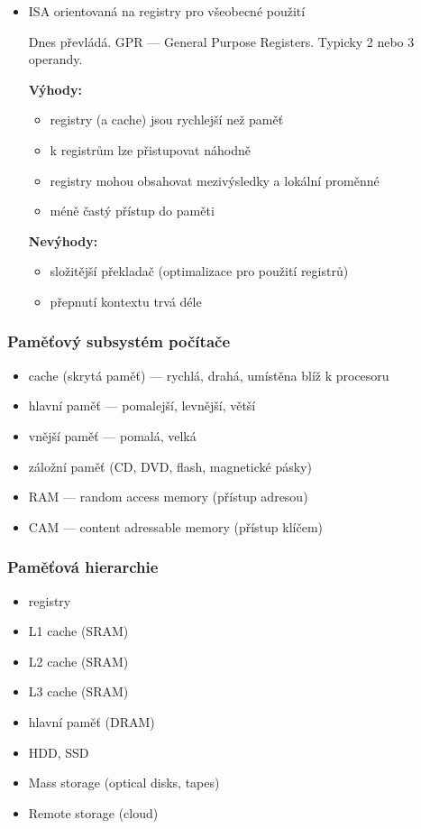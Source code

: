 \begin{itemize}
	\item ISA orientovaná na registry pro všeobecné použití
	
	Dnes převládá. GPR --- General Purpose Registers. Typicky 2 nebo 3 operandy.
	
	\textbf{Výhody:}
	\begin{itemize}
		\item registry (a cache) jsou rychlejší než paměť
		\item k registrům lze přistupovat náhodně
		\item registry mohou obsahovat mezivýsledky a lokální proměnné
		\item méně častý přístup do paměti
	\end{itemize}
	
	\textbf{Nevýhody:}
	\begin{itemize}
		\item složitější překladač (optimalizace pro použití registrů)
		\item přepnutí kontextu trvá déle
	\end{itemize}
\end{itemize}

\subsubsection*{Paměťový subsystém počítače}

\begin{itemize}
	\item cache (skrytá paměť) --- rychlá, drahá, umístěna blíž k procesoru
	\item hlavní paměť --- pomalejší, levnější, větší
	\item vnější paměť --- pomalá, velká
	\item záložní paměť (CD, DVD, flash, magnetické pásky)
\end{itemize}

\begin{itemize}
	\item RAM --- random access memory (přístup adresou)
	\item CAM --- content adressable memory (přístup klíčem)
\end{itemize}

\subsubsection*{Paměťová hierarchie}

\begin{itemize}
	\item registry
	\item L1 cache (SRAM)
	\item L2 cache (SRAM)
	\item L3 cache (SRAM)
	\item hlavní paměť (DRAM)
	\item HDD, SSD
	\item Mass storage (optical disks, tapes)
	\item Remote storage (cloud)
\end{itemize}

